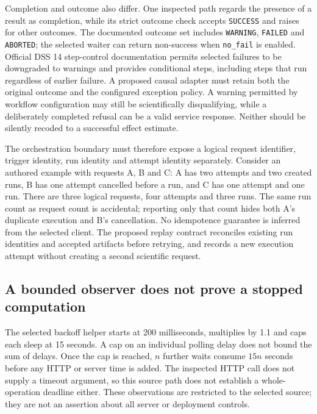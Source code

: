 Completion and outcome also differ. One inspected path regards the presence
of a result as completion, while its strict outcome check accepts
\texttt{SUCCESS} and raises for other outcomes. The documented outcome set
includes \texttt{WARNING}, \texttt{FAILED} and \texttt{ABORTED}; the selected
waiter can return non-success when \texttt{no\_fail} is enabled. Official DSS 14
step-control documentation permits selected failures to be downgraded to
warnings and provides conditional steps, including steps that run regardless
of earlier failure. A proposed causal adapter must retain both the original
outcome and the configured exception policy. A warning permitted by workflow
configuration may still be scientifically disqualifying, while a deliberately
completed refusal can be a valid service response. Neither should be silently
recoded to a successful effect estimate.~\citep{exec24_workflow_contracts_dataiku,exec23_dss_dss14_flow}

The orchestration boundary must therefore expose a logical request identifier,
trigger identity, run identity and attempt identity separately. Consider an
authored example with requests A, B and C: A has two attempts and two created
runs, B has one attempt cancelled before a run, and C has one attempt and one
run. There are three logical requests, four attempts and three runs. The same
run count as request count is accidental; reporting only that count hides both
A's duplicate execution and B's cancellation. No idempotence guarantee is
inferred from the selected client. The proposed replay contract reconciles
existing run identities and accepted artifacts before retrying, and records a
new execution attempt without creating a second scientific request.~\citep{exec25_dataiku_choice}

\subsection{A bounded observer does not prove a stopped computation}
The selected backoff helper starts at 200 milliseconds, multiplies by 1.1 and
caps each sleep at 15 seconds. A cap on an individual polling delay does not
bound the sum of delays. Once the cap is reached, $n$ further waits consume
$15n$ seconds before any HTTP or server time is added. The inspected HTTP call
does not supply a timeout argument, so this source path does not establish a
whole-operation deadline either. These observations are restricted to the
selected source; they are not an assertion about all server or deployment
controls.~\citep{exec24_workflow_contracts_dataiku,exec25_dataiku_choice}


